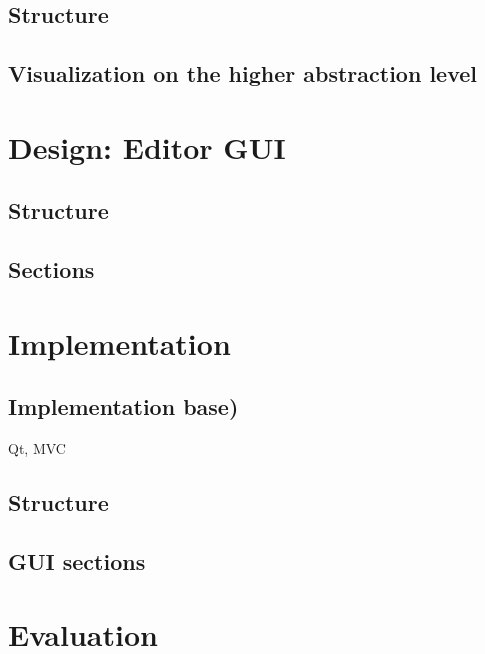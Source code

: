 \documentclass[twoside, openright, 12pt]{book}
\begin{document}
\section{Structure}
\label{gsl_structure}


\section{Visualization on the higher abstraction level}
\label{higher_abstraction_level}




\cleardoublepage
\chapter{Design: Editor GUI}
\label{editor_design}


\section{Structure}
\label{editor_structure}


\section{Sections}
\label{editor_sections}




\cleardoublepage
\chapter{Implementation}
\label{implementation}
	
	
\section{Implementation base)}
\label{implementation_base}
Qt, MVC

\section{Structure}
\label{implementation_structure}
	
	
\section{GUI sections}
\label{implementation_sections}




\cleardoublepage
\chapter{Evaluation}
\label{evaluation}
\end{document}
